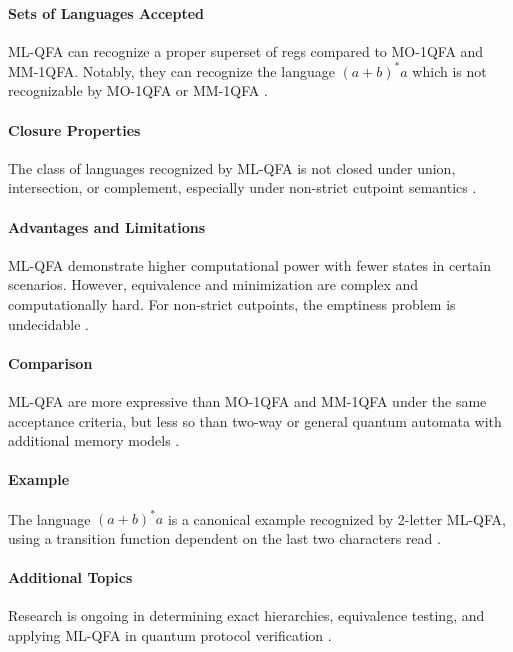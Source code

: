 \paragraph{Sets of Languages Accepted}
ML-QFA can recognize a proper superset of \glspl{reg} compared to MO-1QFA and MM-1QFA. Notably, they can recognize the language $(a + b)^*a$ which is not recognizable by MO-1QFA or MM-1QFA \cite{belovs2007multi}.

\paragraph{Closure Properties}
The class of languages recognized by ML-QFA is not closed under union, intersection, or complement, especially under non-strict cutpoint semantics \cite{qiu2009hierarchy}.

\paragraph{Advantages and Limitations}
ML-QFA demonstrate higher computational power with fewer states in certain scenarios. However, equivalence and minimization are complex and computationally hard. For non-strict cutpoints, the emptiness problem is undecidable \cite{qiu2008decidability}.

\paragraph{Comparison}
ML-QFA are more expressive than MO-1QFA and MM-1QFA under the same acceptance criteria, but less so than two-way or general quantum automata with additional memory models \cite{qiu2011multi}.

\paragraph{Example}
The language $(a + b)^*a$ is a canonical example recognized by 2-letter ML-QFA, using a transition function dependent on the last two characters read \cite{belovs2007multi}.

\paragraph{Additional Topics}
Research is ongoing in determining exact hierarchies, equivalence testing, and applying ML-QFA in quantum protocol verification \cite{lin2012equivalence, qiu2008decidability}.

\subsubsection{}

